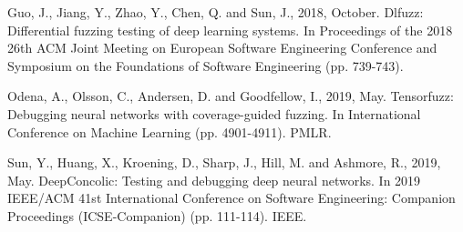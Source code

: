 \documentclass[10pt, conference, a4paper, final]{IEEEtran}
\begin{document}
\begin{thebibliography}{01}
   
    Guo, J., Jiang, Y., Zhao, Y., Chen, Q. and Sun, J., 2018, October. Dlfuzz: Differential fuzzing testing of deep learning systems. In Proceedings of the 2018 26th ACM Joint Meeting on European Software Engineering Conference and Symposium on the Foundations of Software Engineering (pp. 739-743).

     Odena, A., Olsson, C., Andersen, D. and Goodfellow, I., 2019, May. Tensorfuzz: Debugging neural networks with coverage-guided fuzzing. In International Conference on Machine Learning (pp. 4901-4911). PMLR.

    Sun, Y., Huang, X., Kroening, D., Sharp, J., Hill, M. and Ashmore, R., 2019, May. DeepConcolic: Testing and debugging deep neural networks. In 2019 IEEE/ACM 41st International Conference on Software Engineering: Companion Proceedings (ICSE-Companion) (pp. 111-114). IEEE.

\end{thebibliography}
\end{document}
